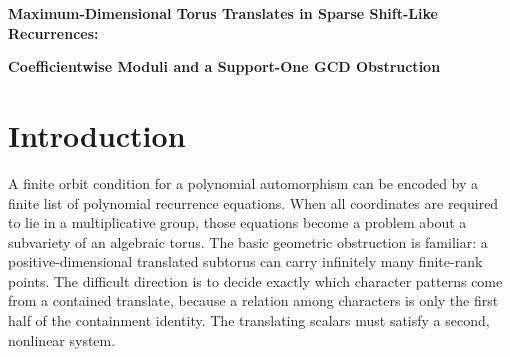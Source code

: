 \documentclass[11pt]{article}
\theoremstyle{remark}
\numberwithin{equation}{section}
\begin{document}
\begin{center}
{\LARGE\bfseries Maximum-Dimensional Torus Translates in Sparse Shift-Like Recurrences:\par}
\vspace{0.35em}
{\LARGE\bfseries Coefficientwise Moduli and a Support-One GCD Obstruction\par}
\end{center}
\vspace{0.8em}

\begin{abstract}
Finite windows of a sparse shift-like recurrence define subvarieties of algebraic tori, but their character relations do not by themselves decide whether a torus translate is actually contained in the window.  We separate these two layers and solve the extremal lifting problem in two regimes.  For a polynomial with a nonzero constant and at least two nonconstant monomials, every translate of maximum possible dimension \(k-m\) has one canonical subgroup.  Its normalized translating scalars form an explicit scheme \(E_m\); we classify its geometric points, prove coefficientwise nonemptiness, determine its reduced components and nilpotent root directions, and construct a flat relative local-complete-intersection family over the fixed-support coefficient torus.  For \(P=c+bX^d\), writing \(g=\gcd(k,\nu)\), \(q=k/g\), and \(L=(k-\nu)/g\), we prove that \(q^2\) core equations extinguish all characters, whereas \(q^2-1\) equations leave one colored Laurent shadow.  The shadow has no compatible translating scalars when \(q\geq3\), so the full window already excludes positive-dimensional translates at \(kq-1\); this is an upper-window obstruction, not an optimal threshold.  When \(q=2\), a lift exists exactly when \(a=-1\) and \(bc^{d-1}=-1\), including every gcd residue.  Laurent's qualitative torus theorem then yields the corresponding finite-rank consequences.
\end{abstract}

\section{Introduction}\label{sec:introduction}

A finite orbit condition for a polynomial automorphism can be encoded by a finite list of polynomial recurrence equations.  When all coordinates are required to lie in a multiplicative group, those equations become a problem about a subvariety of an algebraic torus.  The basic geometric obstruction is familiar: a positive-dimensional translated subtorus can carry infinitely many finite-rank points.  The difficult direction is to decide exactly which character patterns come from a contained translate, because a relation among characters is only the first half of the containment identity.  The translating scalars must satisfy a second, nonlinear system.
\end{document}
